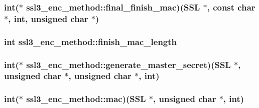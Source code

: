 \hypertarget{structssl3__enc__method_a279f059ffb51e79681dcc220967ac52f}{
\subsubsection[{final\-\_\-finish\-\_\-mac}]{\setlength{\rightskip}{0pt plus 5cm}int($\ast$ ssl3\-\_\-enc\-\_\-method\-::final\-\_\-finish\-\_\-mac)(S\-S\-L $\ast$, const char $\ast$, int, unsigned char $\ast$)}}\label{structssl3__enc__method_a279f059ffb51e79681dcc220967ac52f}
\hypertarget{structssl3__enc__method_a936196b1d38258a1103b0813440a31b2}{
\subsubsection[{finish\-\_\-mac\-\_\-length}]{\setlength{\rightskip}{0pt plus 5cm}int ssl3\-\_\-enc\-\_\-method\-::finish\-\_\-mac\-\_\-length}}\label{structssl3__enc__method_a936196b1d38258a1103b0813440a31b2}
\hypertarget{structssl3__enc__method_a5c06552bd6fce1efdcab90cc2fdb6d3b}{
\subsubsection[{generate\-\_\-master\-\_\-secret}]{\setlength{\rightskip}{0pt plus 5cm}int($\ast$ ssl3\-\_\-enc\-\_\-method\-::generate\-\_\-master\-\_\-secret)(S\-S\-L $\ast$, unsigned char $\ast$, unsigned char $\ast$, int)}}\label{structssl3__enc__method_a5c06552bd6fce1efdcab90cc2fdb6d3b}
\hypertarget{structssl3__enc__method_acb78dd4b89469772b680df62569d9382}{
\subsubsection[{mac}]{\setlength{\rightskip}{0pt plus 5cm}int($\ast$ ssl3\-\_\-enc\-\_\-method\-::mac)(S\-S\-L $\ast$, unsigned char $\ast$, int)}}\label{structssl3__enc__method_acb78dd4b89469772b680df62569d9382}
